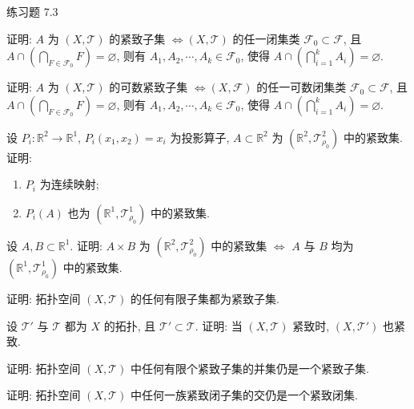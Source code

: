 \begin{exblock}{练习题 7.3}

  \item 证明: $A$ 为 $(X, \mathcal{T})$ 的紧致子集 $\iff (X, \mathcal{T})$ 的任一闭集类 $\mathcal{F}_{0} \subset \mathcal{F}$, 且 $A \cap \left(\bigcap\limits_{F \in \mathcal{F}_{0}} F\right) = \varnothing$, 则有 $A_{1}, A_{2}, \cdots, A_{k} \in \mathcal{F}_{0}$, 使得 $A \cap \left(\bigcap\limits_{i=1}^{k} A_{i}\right) = \varnothing$.

  \item 证明: $A$ 为 $(X, \mathcal{T})$ 的可数紧致子集 $\iff (X, \mathcal{F})$ 的任一可数闭集类 $\mathcal{F}_{0} \subset \mathcal{F}$, 且 $A \cap \left(\bigcap\limits_{F \in \mathcal{F}_{0}} F\right) = \varnothing$, 则有 $A_{1}, A_{2}, \cdots, A_{k} \in \mathcal{F}_{0}$, 使得 $A \cap \left(\bigcap\limits_{i=1}^{k} A_{i}\right) = \varnothing$.

  \item 设 $P_{i}\colon \mathbb{R}^{2} \to \mathbb{R}^{1}$, $P_{i}(x_{1}, x_{2}) = x_{i}$ 为投影算子, $A \subset \mathbb{R}^{2}$ 为 $(\mathbb{R}^{2}, \mathcal{T}_{\rho_{0}}^{2})$ 中的紧致集. 证明:
  \begin{enumerate}
    \item $P_{i}$ 为连续映射;
    \item $P_{i}(A)$ 也为 $(\mathbb{R}^{1}, \mathcal{T}_{\rho_{0}}^{1})$ 中的紧致集.
  \end{enumerate}

  \item 设 $A, B \subset \mathbb{R}^{1}$. 证明: $A \times B$ 为 $(\mathbb{R}^{2}, \mathcal{T}_{\rho_{0}}^{2})$ 中的紧致集 $\iff$ $A$ 与 $B$ 均为 $(\mathbb{R}^{1}, \mathcal{T}_{\rho_{0}}^{1})$ 中的紧致集.

  \item 证明: 拓扑空间 $(X, \mathcal{T})$ 的任何有限子集都为紧致子集.

  \item 设 $\mathcal{T}'$ 与 $\mathcal{T}$ 都为 $X$ 的拓扑, 且 $\mathcal{T}' \subset \mathcal{T}$. 证明: 当 $(X, \mathcal{T})$ 紧致时, $(X, \mathcal{T}')$ 也紧致.

  \item 证明: 拓扑空间 $(X, \mathcal{T})$ 中任何有限个紧致子集的并集仍是一个紧致子集.

  \item 证明: 拓扑空间 $(X, \mathcal{T})$ 中任何一族紧致闭子集的交仍是一个紧致闭集.
\end{exblock}

